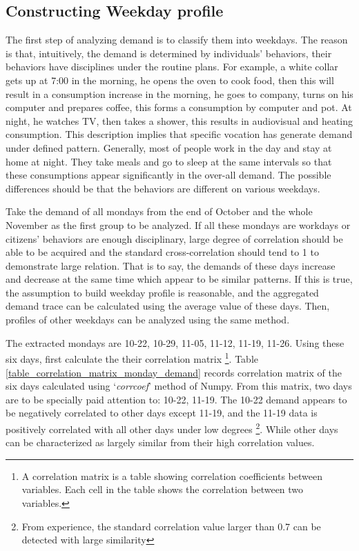 \documentclass[12pt,a4paper]{report}
\begin{document}
                \subsection{Constructing Weekday profile}
                The first step of analyzing demand is to classify them into weekdays. The reason is that, intuitively, the demand is determined by individuals' behaviors, their behaviors
                have disciplines under the routine plans. For example, a white collar gets up at 7:00 in the morning, he opens the oven to cook food, then this will result in a consumption
                increase in the morning, he goes to company, turns on his computer and prepares coffee, this forms a consumption by computer and pot. At night, he watches TV, then takes a shower, this
                results in audiovisual and heating consumption. This description implies that specific vocation has generate demand under defined pattern. Generally, most of people work in the day and 
                stay at home at night. They take meals and go to sleep at the same intervals so that these consumptions appear significantly in the over-all demand. The possible differences should be
                that the behaviors are different on various weekdays.

                Take the demand of all mondays from the end of October and the whole November as the first group to be analyzed. If all these mondays are workdays or citizens' behaviors are
                enough disciplinary, large degree of correlation should be able to be acquired and the standard cross-correlation should tend to 1 to demonstrate large relation. That is to say, 
                the demands of these days increase and decrease at the same time which appear to be similar patterns. If this is true,
                the assumption to build weekday profile is reasonable, and the aggregated demand trace can be calculated using the average value of these days. Then, profiles of other weekdays can be analyzed using the same method.

                The extracted mondays are 10-22, 10-29, 11-05, 11-12, 11-19, 11-26. Using these six days, first calculate the their correlation matrix \footnote{A correlation matrix is a table showing correlation coefficients between variables. Each cell in the table shows the correlation between two variables.}.
                Table \ref{table_correlation_matrix_monday_demand} records correlation matrix of the six days calculated using `\emph{corrcoef}' method of Numpy. From this matrix, two days are to be specially paid attention to: 10-22, 11-19. The 10-22 demand appears to be negatively correlated to other days except 11-19, and the 11-19 data is positively correlated with all other days under low degrees \footnote{From experience, the standard correlation value larger than 0.7 can be detected with large similarity}. While other days can be characterized as largely similar from their high correlation values.
\end{document}
